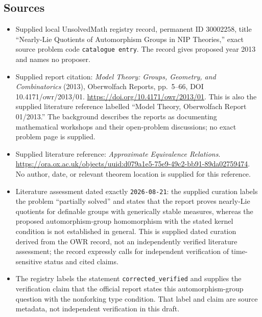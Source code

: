 \documentclass[11pt]{article}
\begin{document}
\subsection{Sources}
\begin{itemize}
\item Supplied local UnsolvedMath registry record, permanent ID \(30002258\), title ``Nearly-Lie Quotients of Automorphism Groups in NIP Theories,'' exact source problem code \texttt{catalogue entry}. The record gives proposed year 2013 and names no proposer.
\item Supplied report citation: \emph{Model Theory: Groups, Geometry, and Combinatorics} (2013), Oberwolfach Reports, pp.\ 5--66, DOI 10.4171/owr/2013/01. \url{https://doi.org/10.4171/owr/2013/01}. This is also the supplied literature reference labelled ``Model Theory, Oberwolfach Report 01/2013.'' The background describes the reports as documenting mathematical workshops and their open-problem discussions; no exact problem page is supplied.
\item Supplied literature reference: \emph{Approximate Equivalence Relations}. \url{https://ora.ox.ac.uk/objects/uuid:d079a1e5-75e9-49c2-bb91-89da02759474}. No author, date, or relevant theorem location is supplied for this reference.
\item Literature assessment dated exactly \texttt{2026-08-21}: the supplied curation labels the problem ``partially solved'' and states that the report proves nearly-Lie quotients for definable groups with generically stable measures, whereas the proposed automorphism-group homomorphism with the stated kernel condition is not established in general. This is supplied dated curation derived from the OWR record, not an independently verified literature assessment; the record expressly calls for independent verification of time-sensitive status and cited claims.
\item The registry labels the statement \texttt{corrected\_verified} and supplies the verification claim that the official report states this automorphism-group question with the nonforking type condition. That label and claim are source metadata, not independent verification in this draft.
\end{itemize}
\end{document}
